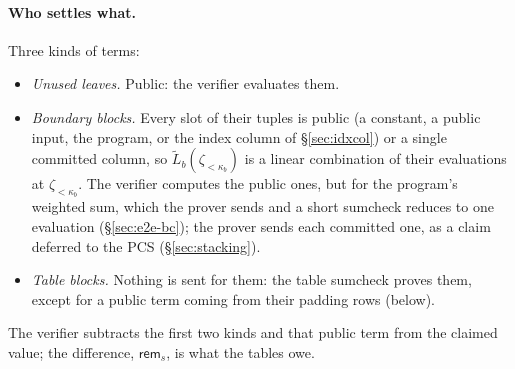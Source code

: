\paragraph{Who settles what.} Three kinds of terms:
\begin{itemize}[itemsep=1pt,topsep=3pt]
\item \emph{Unused leaves.} Public: the verifier evaluates them.
\item \emph{Boundary blocks.} Every slot of their tuples is public (a constant, a public input, the program, or the index column of \S\ref{sec:idxcol}) or a single committed column, so $\widetilde L_b(\zeta_{<\kappa_b})$ is a linear combination of their evaluations at $\zeta_{<\kappa_b}$. The verifier computes the public ones, but for the program's weighted sum, which the prover sends and a short sumcheck reduces to one evaluation (\S\ref{sec:e2e-bc}); the prover sends each committed one, as a claim deferred to the PCS (\S\ref{sec:stacking}).
\item \emph{Table blocks.} Nothing is sent for them: the table sumcheck proves them, except for a public term coming from their padding rows (below).
\end{itemize}
The verifier subtracts the first two kinds and that public term from the claimed value; the difference, $\mathsf{rem}_{s}$, is what the tables owe.

